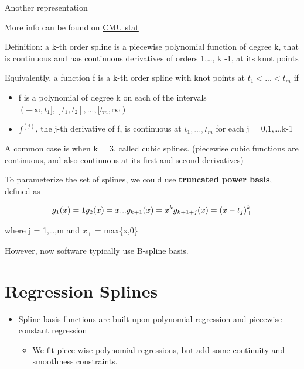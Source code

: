 \documentclass[
]{book}
\providecommand{\tightlist}{%
  \setlength{\itemsep}{0pt}\setlength{\parskip}{0pt}}
\begin{document}
Another representation

More info can be found on \href{https://www.stat.cmu.edu/~ryantibs/advmethods/notes/smoothspline.pdf}{CMU stat}

Definition: a k-th order spline is a piecewise polynomial function of degree k, that is continuous and has continuous derivatives of orders 1,\ldots, k -1, at its knot points

Equivalently, a function f is a k-th order spline with knot points at \(t_1 < ...< t_m\) if

\begin{itemize}
\tightlist
\item
  f is a polynomial of degree k on each of the intervals \((-\infty, t_1], [t_1,t_2],...,[t_m, \infty)\)\\
\item
  \(f^{(j)}\), the j-th derivative of f, is continuous at \(t_1,...,t_m\) for each j = 0,1,\ldots,k-1
\end{itemize}

A common case is when k = 3, called cubic splines. (piecewise cubic functions are continuous, and also continuous at its first and second derivatives)

To parameterize the set of splines, we could use \textbf{truncated power basis}, defined as

\[
g_1(x) = 1 \\
g_2(x) = x \\
... \\
g_{k+1}(x) = x^k \\
g_{k+1+j}(x) = (x-t_j)^k_+
\]

where j = 1,\ldots,m and \(x_+\) = max\{x,0\}

However, now software typically use B-spline basis.

\hypertarget{regression-splines}{%
\section{Regression Splines}\label{regression-splines}}

\begin{itemize}
\item
  Spline basis functions are built upon polynomial regression and piecewise constant regression

  \begin{itemize}
  \tightlist
  \item
    We fit piece wise polynomial regressions, but add some continuity and smoothness constraints.
  \end{itemize}
\end{itemize}
\end{document}
